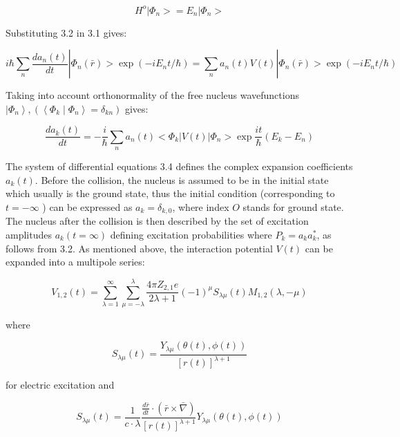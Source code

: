 \documentclass[10pt]{article}
\begin{document}
$$
H^{o}\left|\Phi_{n}>=E_{n}\right| \Phi_{n}>
$$

Substituting 3.2 in 3.1 gives:


\begin{equation*}
i \hbar \sum_{n} \frac{d a_{n}(t)}{d t}\left|\Phi_{n}(\bar{r})>\exp \left(-i E_{n} t / \hbar\right)=\sum_{n} a_{n}(t) V(t)\right| \Phi_{n}(\bar{r})>\exp \left(-i E_{n} t / \hbar\right) \tag{3.3}
\end{equation*}


Taking into account orthonormality of the free nucleus wavefunctions $\left|\Phi_{n}\right\rangle,\left(\left\langle\Phi_{k} \mid \Phi_{n}\right\rangle=\delta_{k n}\right)$ gives:


\begin{equation*}
\frac{d a_{k}(t)}{d t}=-\frac{i}{\hbar} \sum_{n} a_{n}(t)<\Phi_{k}|V(t)| \Phi_{n}>\exp \frac{i t}{\hbar}\left(E_{k}-E_{n}\right) \tag{3.4}
\end{equation*}


The system of differential equations 3.4 defines the complex expansion coefficients $a_{k}(t)$. Before the collision, the nucleus is assumed to be in the initial state which usually is the ground state, thus the initial condition (corresponding to $t=-\infty$ ) can be expressed as $a_{k}=\delta_{k, 0}$, where index $O$ stands for ground state. The nucleus after the collision is then described by the set of excitation amplitudes $a_{k}(t=\infty)$ defining excitation probabilities where $P_{k}=a_{k} a_{k}^{*}$, as follows from 3.2. As mentioned above, the interaction potential $V(t)$ can be expanded into a multipole series:


\begin{equation*}
V_{1,2}(t)=\sum_{\lambda=1}^{\infty} \sum_{\mu=-\lambda}^{\lambda} \frac{4 \pi Z_{2,1} e}{2 \lambda+1}(-1)^{\mu} S_{\lambda \mu}(t) M_{1,2}(\lambda,-\mu) \tag{3.5}
\end{equation*}


where


\begin{equation*}
S_{\lambda \mu}(t)=\frac{Y_{\lambda \mu}(\theta(t), \phi(t))}{[r(t)]^{\lambda+1}} \tag{3.6}
\end{equation*}


for electric excitation and


\begin{equation*}
S_{\lambda \mu}(t)=\frac{1}{c \cdot \lambda} \frac{\frac{d \bar{r}}{d t} \cdot(\bar{r} \times \bar{\nabla})}{[r(t)]^{\lambda+1}} Y_{\lambda \mu}(\theta(t), \phi(t)) \tag{3.7}
\end{equation*}
\end{document}

